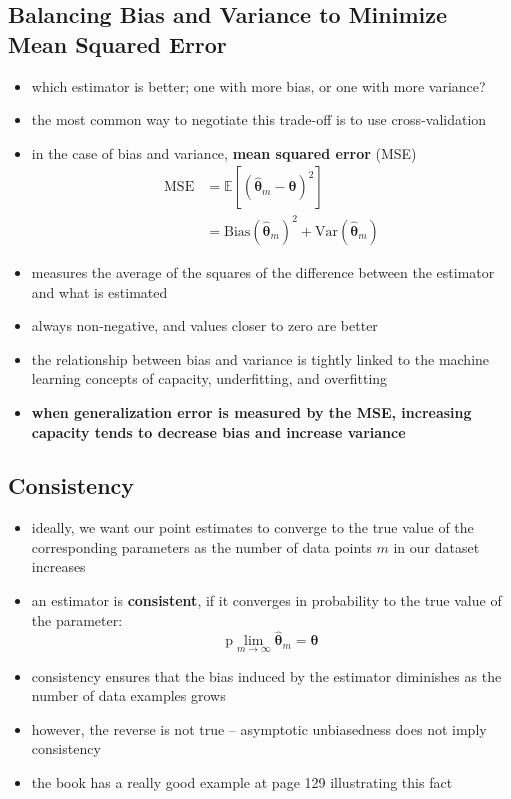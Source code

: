 \documentclass[11pt, twocolumn]{report}
\def\expectation{\mathbb{E}}
\def\Var{\mathrm{Var}}
\def\statistic{\hat{\bm{\theta}}}
\def\parameter{\bm{\theta}}
\begin{document}
\subsection{Balancing Bias and Variance to Minimize Mean Squared Error}
\begin{itemize}
  \item which estimator is better; one with more bias, or one with more
    variance?
  \item the most common way to negotiate this trade-off is to use
    cross-validation
  \item in the case of bias and variance, \textbf{mean squared error} (MSE)
    \begin{align}
      \text{MSE} &= \expectation[(\statistic_m - \parameter)^2]\\
      &= \text{Bias}(\statistic_m)^2 + \Var(\statistic_m)
    \end{align}
  \item measures the average of the squares of the difference between the
    estimator and what is estimated
  \item always non-negative, and values closer to zero are better
  \item the relationship between bias and variance is tightly linked to the
    machine learning concepts of capacity, underfitting, and overfitting
  \item \textbf{when generalization error is measured by the MSE, increasing
      capacity tends to decrease bias and increase variance}  
\end{itemize}

\subsection{Consistency}
\begin{itemize}
  \item ideally, we want our point estimates to converge to the true value of
    the corresponding parameters as the number of data points $m$ in our
    dataset increases
  \item an estimator is \textbf{consistent}, if it converges in probability to
    the true value of the parameter:
    \begin{equation}
      \text{p}\lim_{m \to \infty} \statistic_m = \parameter
    \end{equation}
  \item consistency ensures that the bias induced by the estimator diminishes
    as the number of data examples grows
  \item however, the reverse is not true -- asymptotic unbiasedness does not
    imply consistency
  \item the book has a really good example at page 129 illustrating this fact
\end{itemize}
\end{document}

